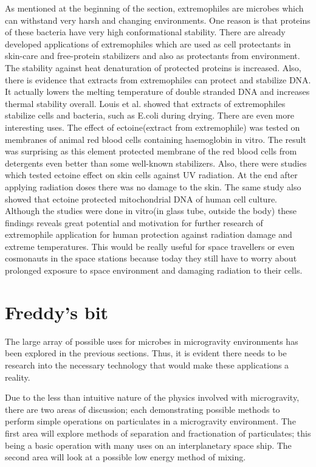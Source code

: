 \documentclass[12pt]{article}
\begin{document}
As mentioned at the beginning of the section, extremophiles are microbes which can withstand
very harsh and changing environments. One reason is that proteins of these bacteria have very
high conformational stability. There are already developed applications of extremophiles which
are used as cell protectants in skin-care and free-protein stabilizers and also as protectants from
environment. The stability against heat denaturation of protected proteins is increased. Also,
there is evidence that extracts from extremophiles can protect and stabilize DNA. It actually
lowers the melting temperature of double stranded DNA and increases thermal stability overall.
Louis et al. showed that extracts of extremophiles stabilize cells and bacteria, such as E.coli
during drying. There are even more interesting uses. The effect of ectoine(extract from
extremophile) was tested on membranes of animal red blood cells containing haemoglobin in
vitro. The result was surprising as this element protected membrane of the red blood cells from detergents even better than some well-known stabilizers. Also, there were studies which tested
ectoine effect on skin cells against UV radiation. At the end after applying radiation doses there
was no damage to the skin. The same study also showed that ectoine protected mitochondrial
DNA of human cell culture. Although the studies were done in vitro(in glass tube, outside the
body) these findings reveals great potential and motivation for further research of extremophile
application for human protection against radiation damage and extreme temperatures. This
would be really useful for space travellers or even cosmonauts in the space stations because
today they still have to worry about prolonged exposure to space environment and damaging
radiation to their cells.



\section{Freddy's bit}
The large array of possible uses for microbes in microgravity environments has been explored in the previous sections. Thus, it is evident there needs to be research into the necessary technology that would make these applications a reality.

Due to the less than intuitive nature of the physics involved with microgravity, there are two areas of discussion; each demonstrating possible methods to perform simple operations on particulates in a microgravity environment. The first area will explore methods of separation and fractionation of particulates; this being a basic operation with many uses on an interplanetary space ship. The 
second area will look at a possible low energy method of mixing.
\end{document}
